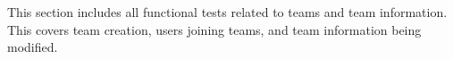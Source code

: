 \documentclass[12pt, titlepage]{article}
\begin{document}
This section includes all functional tests related to teams and team
information. This covers team creation, users joining teams, and team
information being modified.

\begin{enumerate}




















\end{enumerate}
\end{document}
